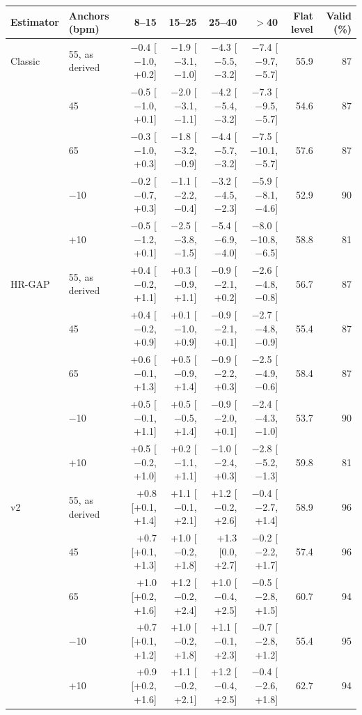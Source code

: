 \begin{tabular}{@{}llrrrrrr@{}}
\toprule
Estimator & Anchors (bpm) & 8--15 & 15--25 & 25--40 & $>$40 & Flat level & Valid (\%) \\
\midrule
Classic & \HRrest{} 55, \HRmax{} as derived & $-$0.4 [$-$1.0, +0.2] & $-$1.9 [$-$3.1, $-$1.0] & $-$4.3 [$-$5.5, $-$3.2] & $-$7.4 [$-$9.7, $-$5.7] & 55.9 & 87 \\
 & \HRrest{} 45 & $-$0.5 [$-$1.0, +0.1] & $-$2.0 [$-$3.1, $-$1.1] & $-$4.2 [$-$5.4, $-$3.2] & $-$7.3 [$-$9.5, $-$5.7] & 54.6 & 87 \\
 & \HRrest{} 65 & $-$0.3 [$-$1.0, +0.3] & $-$1.8 [$-$3.2, $-$0.9] & $-$4.4 [$-$5.7, $-$3.2] & $-$7.5 [$-$10.1, $-$5.7] & 57.6 & 87 \\
 & \HRmax{} $-$10 & $-$0.2 [$-$0.7, +0.3] & $-$1.1 [$-$2.2, $-$0.4] & $-$3.2 [$-$4.5, $-$2.3] & $-$5.9 [$-$8.1, $-$4.6] & 52.9 & 90 \\
 & \HRmax{} $+$10 & $-$0.5 [$-$1.2, +0.1] & $-$2.5 [$-$3.8, $-$1.5] & $-$5.4 [$-$6.9, $-$4.0] & $-$8.0 [$-$10.8, $-$6.5] & 58.8 & 81 \\
\addlinespace[2pt]
HR-GAP & \HRrest{} 55, \HRmax{} as derived & +0.4 [$-$0.2, +1.1] & +0.3 [$-$0.9, +1.1] & $-$0.9 [$-$2.1, +0.2] & $-$2.6 [$-$4.8, $-$0.8] & 56.7 & 87 \\
 & \HRrest{} 45 & +0.4 [$-$0.2, +0.9] & +0.1 [$-$1.0, +0.9] & $-$0.9 [$-$2.1, +0.1] & $-$2.7 [$-$4.8, $-$0.9] & 55.4 & 87 \\
 & \HRrest{} 65 & +0.6 [$-$0.1, +1.3] & +0.5 [$-$0.9, +1.4] & $-$0.9 [$-$2.2, +0.3] & $-$2.5 [$-$4.9, $-$0.6] & 58.4 & 87 \\
 & \HRmax{} $-$10 & +0.5 [$-$0.1, +1.1] & +0.5 [$-$0.5, +1.4] & $-$0.9 [$-$2.0, +0.1] & $-$2.4 [$-$4.3, $-$1.0] & 53.7 & 90 \\
 & \HRmax{} $+$10 & +0.5 [$-$0.2, +1.0] & +0.2 [$-$1.1, +1.1] & $-$1.0 [$-$2.4, +0.3] & $-$2.8 [$-$5.2, $-$1.3] & 59.8 & 81 \\
\addlinespace[2pt]
\ascent{} v2 & \HRrest{} 55, \HRmax{} as derived & +0.8 [+0.1, +1.4] & +1.1 [$-$0.1, +2.1] & +1.2 [$-$0.2, +2.6] & $-$0.4 [$-$2.7, +1.4] & 58.9 & 96 \\
 & \HRrest{} 45 & +0.7 [+0.1, +1.3] & +1.0 [$-$0.2, +1.8] & +1.3 [0.0, +2.7] & $-$0.2 [$-$2.2, +1.7] & 57.4 & 96 \\
 & \HRrest{} 65 & +1.0 [+0.2, +1.6] & +1.2 [$-$0.2, +2.4] & +1.0 [$-$0.4, +2.5] & $-$0.5 [$-$2.8, +1.5] & 60.7 & 94 \\
 & \HRmax{} $-$10 & +0.7 [+0.1, +1.2] & +1.0 [$-$0.2, +1.8] & +1.1 [$-$0.1, +2.3] & $-$0.7 [$-$2.8, +1.2] & 55.4 & 95 \\
 & \HRmax{} $+$10 & +0.9 [+0.2, +1.6] & +1.1 [$-$0.2, +2.1] & +1.2 [$-$0.4, +2.5] & $-$0.4 [$-$2.6, +1.8] & 62.7 & 94 \\
\bottomrule
\end{tabular}
